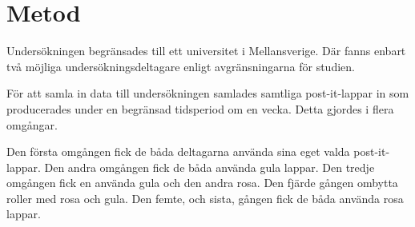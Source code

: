 \section{Metod}
\label{ch:method}
Undersökningen begränsades till ett universitet i Mellansverige.
Där fanns enbart två möjliga undersökningsdeltagare enligt avgränsningarna för 
studien.

För att samla in data till undersökningen samlades samtliga post-it-lappar in 
som producerades under en begränsad tidsperiod om en vecka.
Detta gjordes i flera omgångar.

Den första omgången fick de båda deltagarna använda sina eget valda 
post-it-lappar.
Den andra omgången fick de båda använda gula lappar.
Den tredje omgången fick en använda gula och den andra rosa.
Den fjärde gången ombytta roller med rosa och gula.
Den femte, och sista, gången fick de båda använda rosa lappar.
